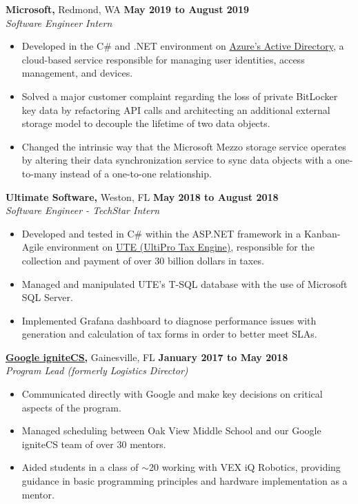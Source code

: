 \documentclass[11pt]{article} %
\begin{document}
		\noindent \textbf{Microsoft,} Redmond, WA \hfill\textbf{May 2019 to August 2019}\\
		\textit{Software Engineer Intern}
		\begin{itemize}[noitemsep,nolistsep, label = {-}]
			\item Developed in the C\# and .NET environment on \href{https://docs.microsoft.com/en-us/azure/active-directory/fundamentals/active-directory-whatis}{Azure's Active Directory}, a cloud-based service responsible for managing user identities, access management, and devices.
			\item Solved a major customer complaint regarding the loss of private BitLocker key data by refactoring API calls and architecting an additional external storage model to decouple the lifetime of two data objects.
			\item Changed the intrinsic way that the Microsoft Mezzo storage service operates by altering their data synchronization service to sync data objects with a one-to-many instead of a one-to-one relationship.
		\end{itemize}
	
		\vspace{.20cm}
		
		\noindent \textbf{Ultimate Software,} Weston, FL \hfill\textbf{May 2018 to August 2018}\\
		\textit{Software Engineer - TechStar Intern}
		\begin{itemize}[noitemsep,nolistsep, label = {-}]
			\item Developed and tested in C\# within the ASP.NET framework in a Kanban-Agile environment on \href{https://www.ultimatesoftware.com/UltiPro-Solution-Features-Payment-Services}{UTE (UltiPro Tax Engine)}, responsible for the collection and payment of over 30 billion dollars in taxes.
			\item Managed and manipulated UTE's T-SQL database with the use of Microsoft SQL Server.
			\item Implemented Grafana dashboard to diagnose performance issues with generation and calculation of tax forms in order to better meet SLAs.
		\end{itemize}
		\vspace{.20cm}
		
		\noindent \href{https://sites.google.com/view/ignitecs/home}{\textbf{Google igniteCS,}} Gainesville, FL \hfill\textbf{January 2017 to May 2018}\\
		\textit{Program Lead (formerly Logistics Director)}
		\begin{itemize}[noitemsep,nolistsep, label = {-}]
			\item Communicated directly with Google and make key decisions on critical aspects of the program.
			\item Managed scheduling between Oak View Middle School and our Google igniteCS team of over 30 mentors.
			\item Aided students in a class of $\sim$20 working with VEX iQ Robotics, providing guidance in basic programming principles and hardware implementation as a mentor.
		\end{itemize} 
		\vspace{.20cm}
		
\end{document}
